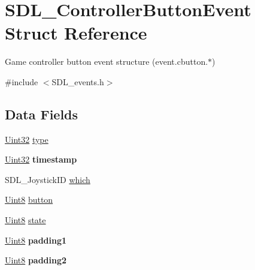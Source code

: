 \hypertarget{struct_s_d_l___controller_button_event}{}\section{S\+D\+L\+\_\+\+Controller\+Button\+Event Struct Reference}
\label{struct_s_d_l___controller_button_event}


Game controller button event structure (event.\+cbutton.$\ast$)  




{\ttfamily \#include $<$S\+D\+L\+\_\+events.\+h$>$}

\subsection*{Data Fields}
\begin{DoxyCompactItemize}
\item 
\hyperlink{_s_d_l__stdinc_8h_add440eff171ea5f55cb00c4a9ab8672d}{Uint32} \hyperlink{struct_s_d_l___controller_button_event_aa40a9b05c3154032b9f2d7220e9f08dc}{type}
\item 
\hyperlink{_s_d_l__stdinc_8h_add440eff171ea5f55cb00c4a9ab8672d}{Uint32} {\bfseries timestamp}\hypertarget{struct_s_d_l___controller_button_event_abf1ed7edeab81db9c05d899836a44a2f}{}\label{struct_s_d_l___controller_button_event_abf1ed7edeab81db9c05d899836a44a2f}

\item 
S\+D\+L\+\_\+\+Joystick\+ID \hyperlink{struct_s_d_l___controller_button_event_a911f8b28e26cf5ad3e985e76d4987014}{which}
\item 
\hyperlink{_s_d_l__stdinc_8h_a2944638813a090aa23e62f4da842c3e2}{Uint8} \hyperlink{struct_s_d_l___controller_button_event_a63c1d3c03e676c0ea5864dc6d0b0082c}{button}
\item 
\hyperlink{_s_d_l__stdinc_8h_a2944638813a090aa23e62f4da842c3e2}{Uint8} \hyperlink{struct_s_d_l___controller_button_event_a6b8d8e916bc56265a3fd279bd26b6d1b}{state}
\item 
\hyperlink{_s_d_l__stdinc_8h_a2944638813a090aa23e62f4da842c3e2}{Uint8} {\bfseries padding1}\hypertarget{struct_s_d_l___controller_button_event_a418ddf227b900bac743797ea1d27040f}{}\label{struct_s_d_l___controller_button_event_a418ddf227b900bac743797ea1d27040f}

\item 
\hyperlink{_s_d_l__stdinc_8h_a2944638813a090aa23e62f4da842c3e2}{Uint8} {\bfseries padding2}\hypertarget{struct_s_d_l___controller_button_event_a09e3169fff93f108fc1dab93014eb1fb}{}\label{struct_s_d_l___controller_button_event_a09e3169fff93f108fc1dab93014eb1fb}

\end{DoxyCompactItemize}


